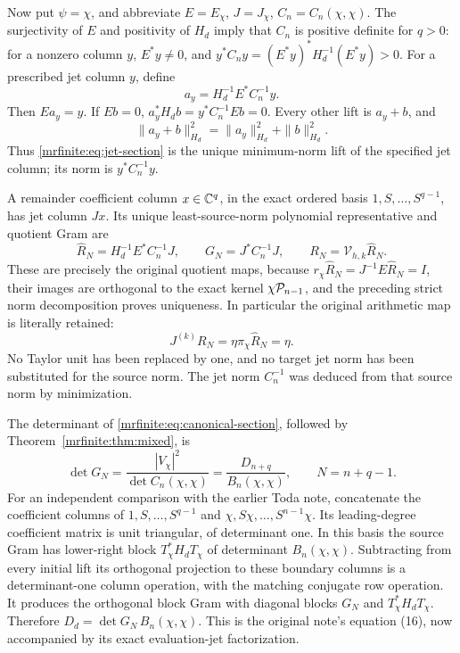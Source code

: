 Now put \(\psi=\chi\), and abbreviate
\(E=E_\chi\), \(J=J_\chi\), \(C_n=C_n(\chi,\chi)\).
The surjectivity of \(E\) and positivity of \(H_d\) imply that \(C_n\)
is positive definite for \(q>0\): for a nonzero column \(y\),
\(E^*y\ne0\), and \(y^*C_ny=(E^*y)^*H_d^{-1}(E^*y)>0\).
For a prescribed jet column \(y\), define
\begin{equation}\label{mrfinite:eq:jet-section}
 a_y=H_d^{-1}E^*C_n^{-1}y.
\end{equation}
Then \(Ea_y=y\). If \(Eb=0\),
\(a_y^*H_db=y^*C_n^{-1}Eb=0\). Every other lift is \(a_y+b\), and
\[
 \|a_y+b\|_{H_d}^2=\|a_y\|_{H_d}^2+\|b\|_{H_d}^2.
\]
Thus \eqref{mrfinite:eq:jet-section} is the unique minimum-norm lift of the
specified jet column; its norm is \(y^*C_n^{-1}y\).

A remainder coefficient column \(x\in\mathbb C^q\), in the exact ordered basis
\(1,S,\ldots,S^{q-1}\), has jet column \(Jx\). Its unique
least-source-norm polynomial representative and quotient Gram are
\begin{equation}\label{mrfinite:eq:canonical-section}
 \widehat R_N=H_d^{-1}E^*C_n^{-1}J,\qquad
 G_N=J^*C_n^{-1}J,\qquad R_N=\mathcal V_{h,k}\widehat R_N.
\end{equation}
These are precisely the original quotient maps, because
\(r_\chi\widehat R_N=J^{-1}E\widehat R_N=I\), their images are
orthogonal to the exact kernel \(\chi\mathcal P_{n-1}\), and the preceding
strict norm decomposition proves uniqueness. In particular the
original arithmetic map is literally retained:
\[
 J^{(k)}R_N=\eta\pi_\chi\widehat R_N=\eta.
\]
No Taylor unit has been replaced by one, and no target jet norm has been
substituted for the source norm. The jet norm \(C_n^{-1}\) was deduced
from that source norm by minimization.

The determinant of \eqref{mrfinite:eq:canonical-section}, followed by
Theorem~\ref{mrfinite:thm:mixed}, is
\begin{equation}\label{mrfinite:eq:quotientdet}
 \boxed{\det G_N=\frac{|V_\chi|^2}{\det C_n(\chi,\chi)}
              =\frac{D_{n+q}}{B_n(\chi,\chi)},
       \qquad N=n+q-1.}
\end{equation}
For an independent comparison with the earlier Toda note, concatenate
the coefficient columns of
\(1,S,\ldots,S^{q-1}\) and
\(\chi,S\chi,\ldots,S^{n-1}\chi\).
Its leading-degree coefficient matrix is unit triangular, of determinant
one. In this basis the source Gram has lower-right block
\(T_\chi^*H_dT_\chi\) of determinant \(B_n(\chi,\chi)\).
Subtracting from every initial lift its orthogonal projection to these
boundary columns is a determinant-one column operation, with the
matching conjugate row operation. It produces the orthogonal block Gram
with diagonal blocks \(G_N\) and \(T_\chi^*H_dT_\chi\).
Therefore \(D_d=\det G_N\,B_n(\chi,\chi)\).
This is the original note's equation (16), now accompanied by its exact
evaluation-jet factorization.

